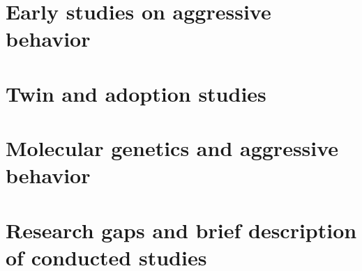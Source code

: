
\section{Early studies on aggressive behavior}
\label{sec:early_studies_on_aggressive_behavior}


\section{Twin and adoption studies}
\label{sec:twin_and_adoption_studies}


\section{Molecular genetics and aggressive behavior}
\label{sec:molecular_genetics_and_aggressive_behavior}


\section{Research gaps and brief description of conducted studies}
\label{sec:research_gaps_and_brief_description_of_conducted_studies}

